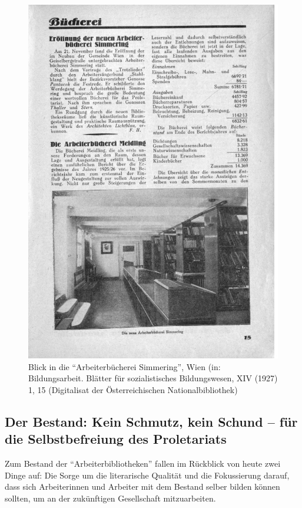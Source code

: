 \documentclass[a4paper,
fontsize=11pt,
oneside,
numbers=noperiodatend,
parskip=half-,
bibliography=totoc,
final
]{scrartcl}
\begin{document}
\begin{figure}
\centering
\includegraphics[width=.9\textwidth]{img/Schuldt02.jpg}
\caption{Blick in die \enquote{Arbeiterbücherei Simmering}, Wien (in:
Bildungsarbeit. Blätter für sozialistisches Bildungswesen, XIV (1927) 1,
15 (Digitalisat der Österreichischen Nationalbibliothek)}
\end{figure}

\hypertarget{der-bestand-kein-schmutz-kein-schund-fuxfcr-die-selbstbefreiung-des-proletariats}{%
\subsection{Der Bestand: Kein Schmutz, kein Schund -- für die
Selbstbefreiung des
Proletariats}\label{der-bestand-kein-schmutz-kein-schund-fuxfcr-die-selbstbefreiung-des-proletariats}}

Zum Bestand der \enquote{Arbeiterbibliotheken} fallen im Rückblick von
heute zwei Dinge auf: Die Sorge um die literarische Qualität und die
Fokussierung darauf, dass sich Arbeiterinnen und Arbeiter mit dem
Bestand selber bilden können sollten, um an der zukünftigen Gesellschaft
mitzuarbeiten.
\end{document}
